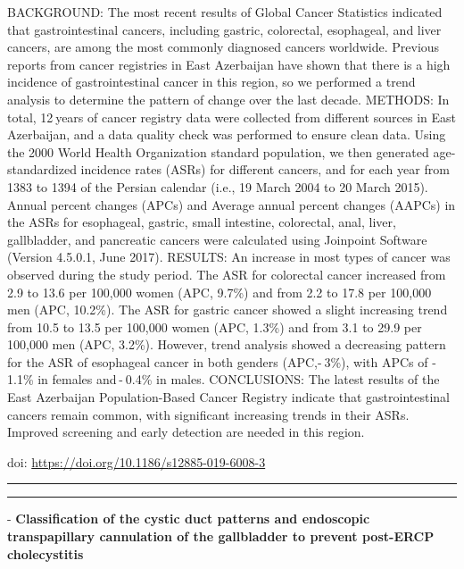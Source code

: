 \documentclass[]{article}
\begin{document}
BACKGROUND: The most recent results of Global Cancer Statistics
indicated that gastrointestinal cancers, including gastric, colorectal,
esophageal, and liver cancers, are among the most commonly diagnosed
cancers worldwide. Previous reports from cancer registries in East
Azerbaijan have shown that there is a high incidence of gastrointestinal
cancer in this region, so we performed a trend analysis to determine the
pattern of change over the last decade. METHODS: In total, 12 years of
cancer registry data were collected from different sources in East
Azerbaijan, and a data quality check was performed to ensure clean data.
Using the 2000 World Health Organization standard population, we then
generated age-standardized incidence rates (ASRs) for different cancers,
and for each year from 1383 to 1394 of the Persian calendar (i.e., 19
March 2004 to 20 March 2015). Annual percent changes (APCs) and Average
annual percent changes (AAPCs) in the ASRs for esophageal, gastric,
small intestine, colorectal, anal, liver, gallbladder, and pancreatic
cancers were calculated using Joinpoint Software (Version 4.5.0.1, June
2017). RESULTS: An increase in most types of cancer was observed during
the study period. The ASR for colorectal cancer increased from 2.9 to
13.6 per 100,000 women (APC, 9.7\%) and from 2.2 to 17.8 per 100,000 men
(APC, 10.2\%). The ASR for gastric cancer showed a slight increasing
trend from 10.5 to 13.5 per 100,000 women (APC, 1.3\%) and from 3.1 to
29.9 per 100,000 men (APC, 3.2\%). However, trend analysis showed a
decreasing pattern for the ASR of esophageal cancer in both genders
(APC,- 3\%), with APCs of - 1.1\% in females and - 0.4\% in males.
CONCLUSIONS: The latest results of the East Azerbaijan Population-Based
Cancer Registry indicate that gastrointestinal cancers remain common,
with significant increasing trends in their ASRs. Improved screening and
early detection are needed in this region.

doi: \url{https://doi.org/10.1186/s12885-019-6008-3}

{}

{}

\begin{center}\rule{0.5\linewidth}{\linethickness}\end{center}

\begin{center}\rule{0.5\linewidth}{\linethickness}\end{center}

 - \textbf{Classification of the cystic duct patterns and endoscopic
transpapillary cannulation of the gallbladder to prevent post-ERCP
cholecystitis}
\end{document}
